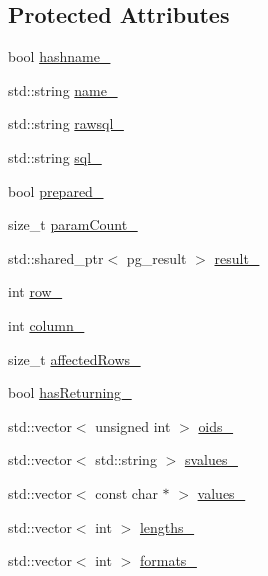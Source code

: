\subsection*{Protected Attributes}
\begin{DoxyCompactItemize}
\item 
bool \hyperlink{classdbo_1_1stmt_1_1_prepared_statement_a5ce77cce92c44e28439c8a48d82d49c0}{hashname\+\_\+}
\item 
std\+::string \hyperlink{classdbo_1_1stmt_1_1_prepared_statement_a2a9f1924623015da69452ee4a76a8c95}{name\+\_\+}
\item 
std\+::string \hyperlink{classdbo_1_1stmt_1_1_prepared_statement_ae40cc1d7bed1014bddb5c3ea26cbbc22}{rawsql\+\_\+}
\item 
std\+::string \hyperlink{classdbo_1_1stmt_1_1_prepared_statement_af86636880d2769856602206df3f6b745}{sql\+\_\+}
\item 
bool \hyperlink{classdbo_1_1stmt_1_1_prepared_statement_a7657f4e518a93c0b9b437f7e616cf45d}{prepared\+\_\+}
\item 
size\+\_\+t \hyperlink{classdbo_1_1stmt_1_1_prepared_statement_af124f6fa66f785968da90ab0c1c65862}{param\+Count\+\_\+}
\item 
std\+::shared\+\_\+ptr$<$ pg\+\_\+result $>$ \hyperlink{classdbo_1_1stmt_1_1_prepared_statement_ab069cf8eedb47bd9ac0ee6d5b24e2afb}{result\+\_\+}
\item 
int \hyperlink{classdbo_1_1stmt_1_1_prepared_statement_a65f197eaa23cb862ac56009d8ca18e60}{row\+\_\+}
\item 
int \hyperlink{classdbo_1_1stmt_1_1_prepared_statement_afb28c6676ebd608932654dde2722eae8}{column\+\_\+}
\item 
size\+\_\+t \hyperlink{classdbo_1_1stmt_1_1_prepared_statement_acf79026811fc4238d5bbd50283029be6}{affected\+Rows\+\_\+}
\item 
bool \hyperlink{classdbo_1_1stmt_1_1_prepared_statement_a2eb8c6d22ad2f31295fe41a9c5cfffc8}{has\+Returning\+\_\+}
\item 
std\+::vector$<$ unsigned int $>$ \hyperlink{classdbo_1_1stmt_1_1_prepared_statement_a84dc480075707811e5b4122fdff08615}{oids\+\_\+}
\item 
std\+::vector$<$ std\+::string $>$ \hyperlink{classdbo_1_1stmt_1_1_prepared_statement_a312b978fcd4467e19aba95f944d9e76c}{svalues\+\_\+}
\item 
std\+::vector$<$ const char $\ast$ $>$ \hyperlink{classdbo_1_1stmt_1_1_prepared_statement_a125336886e5cd1e39fd5711b0c91c902}{values\+\_\+}
\item 
std\+::vector$<$ int $>$ \hyperlink{classdbo_1_1stmt_1_1_prepared_statement_a8bf1e4037693e44dbaebffcd1f312c0d}{lengths\+\_\+}
\item 
std\+::vector$<$ int $>$ \hyperlink{classdbo_1_1stmt_1_1_prepared_statement_a2e95148521796406741f62077f3a5576}{formats\+\_\+}
\end{DoxyCompactItemize}


